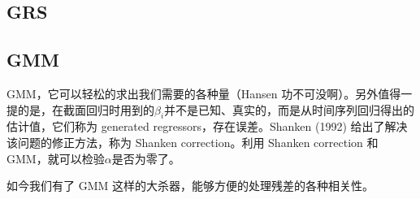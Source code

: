\documentclass[11pt]{article}
\begin{document}
\subsection{GRS}

\subsection{GMM}

GMM，它可以轻松的求出我们需要的各种量（Hansen 功不可没啊）。另外值得一提的是，在截面回归时用到的$\beta_i$并不是已知、真实的，而是从时间序列回归得出的估计值，它们称为 generated regressors，存在误差。Shanken (1992) 给出了解决该问题的修正方法，称为 Shanken correction。利用 Shanken correction 和 GMM，就可以检验$\alpha$是否为零了。

如今我们有了 GMM 这样的大杀器，能够方便的处理残差的各种相关性。

\appendix
\end{document}
